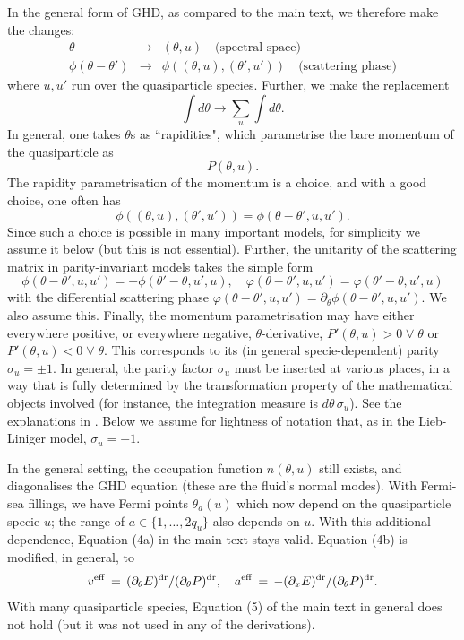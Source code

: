 \documentclass[twocolumn,amsfonts,showpacs,superscriptaddress]{revtex4-1}
\begin{document}
\begin{widetext}
In the general form of GHD, as compared to the main text, we therefore make the changes:
\begin{eqnarray}
	\theta &\longrightarrow&  (\theta,u)\quad \mbox{(spectral space)}\\
	\phi(\theta-\theta') &\longrightarrow&
	\phi((\theta,u),(\theta',u'))\quad \mbox{(scattering phase)}
\end{eqnarray}
where $u,u'$ run over the quasiparticle species. Further, we make the replacement
\begin{equation}
	\int d\theta \longrightarrow  \sum_u\int d\theta.
\end{equation}
In general, one takes $\theta$s as ``rapidities", which  parametrise the bare momentum of the quasiparticle as
\begin{equation}
	P(\theta,u).
\end{equation}
The rapidity parametrisation of the momentum is a choice, and with a good choice, one often has
\begin{equation}
	\phi((\theta,u),(\theta',u')) = \phi(\theta-\theta',u,u').
\end{equation}
Since such a choice is possible in many important models, for simplicity we assume it below (but this is not essential). Further, the unitarity of the scattering matrix in parity-invariant models takes the simple form
\begin{equation}\label{symuu}
	\phi(\theta-\theta',u,u') = -\phi(\theta'-\theta,u',u),\quad
	\varphi(\theta-\theta',u,u') = \varphi(\theta'-\theta,u',u)
\end{equation}
with the differential scattering phase $\varphi(\theta-\theta',u,u') = \partial_\theta \phi(\theta-\theta',u,u')$. We also assume this. Finally, the momentum parametrisation may have either everywhere positive, or everywhere negative, $\theta$-derivative, $P'(\theta,u)>0\;\forall\;\theta$ or $P'(\theta,u)<0\;\forall\;\theta$. This corresponds to its (in general specie-dependent) parity $\sigma_u=\pm1$. In general, the parity factor $\sigma_u$ must be inserted at various places, in a way that is fully determined by the transformation property of the mathematical objects involved (for instance, the integration measure is $d\theta\,\sigma_u$). See the explanations in \cite{10.21468/SciPostPhys.6.4.049}. Below we assume for lightness of notation that, as in the Lieb-Liniger model, $\sigma_u=+1$.

In the general setting, the occupation function $n(\theta,u)$ still exists, and diagonalises the GHD equation (these are the fluid's normal modes). With Fermi-sea fillings, we have Fermi points $\theta_a(u)$ which now depend on the quasiparticle specie $u$; the range of $a\in\{1,\ldots,2q_u\}$ also depends on $u$. With this additional dependence, Equation (4a) in the main text stays valid. Equation (4b) is modified, in general, to
\begin{equation}
	v^{\rm eff}  \, = \, (\partial_\theta E)^{\rm dr} / (\partial_\theta P)^{\rm dr}   ,\quad
	a^{\rm eff}  \, = \, -(\partial_xE)^{\rm dr} / (\partial_\theta P)^{\rm dr}.
\end{equation}
With many quasiparticle species, Equation (5) of the main text in general does not hold (but it was not used in any of the derivations).


\end{widetext}
\end{document}
